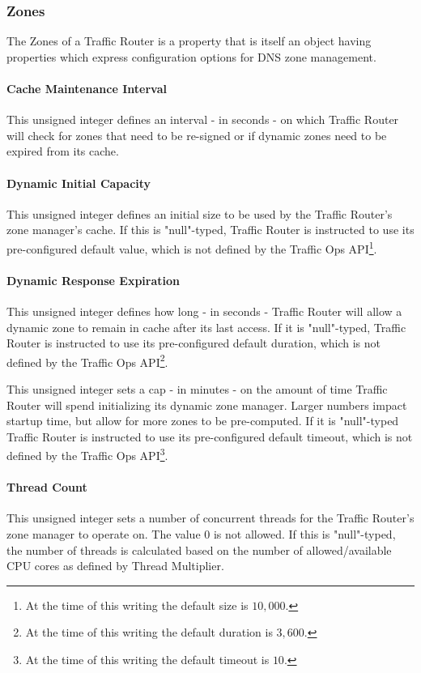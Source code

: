 \subsubsection{Zones}
The Zones of a Traffic Router is a property that is itself an object having
properties which express configuration options for DNS zone management.

\paragraph{Cache Maintenance Interval}
This unsigned integer defines an interval - in seconds - on which Traffic Router
will check for zones that need to be re-signed or if dynamic zones need to be
expired from its cache.

\paragraph{Dynamic Initial Capacity}
This unsigned integer defines an initial size to be used by the Traffic Router's
zone manager's cache. If this is "null"-typed, Traffic Router is instructed to
use its pre-configured default value, which is not defined by the Traffic Ops
API\footnote{At the time of this writing the default size is $10,000$.}.

\paragraph{Dynamic Response Expiration}
This unsigned integer defines how long - in seconds - Traffic Router will allow
a dynamic zone to remain in cache after its last access. If it is "null"-typed,
Traffic Router is instructed to use its pre-configured default duration, which
is not defined by the Traffic Ops API\footnote{At the time of this writing the
default duration is $3,600$.}.

This unsigned integer sets a cap - in minutes - on the amount of time Traffic
Router will spend initializing its dynamic zone manager. Larger numbers impact
startup time, but allow for more zones to be pre-computed. If it is "null"-typed
Traffic Router is instructed to use its pre-configured default timeout, which is
not defined by the Traffic Ops API\footnote{At the time of this writing the
default timeout is $10$.}.

\paragraph{Thread Count}
This unsigned integer sets a number of concurrent threads for the Traffic
Router's zone manager to operate on. The value 0 is not allowed. If this is
"null"-typed, the number of threads is calculated based on the number of
allowed/available CPU cores as defined by Thread Multiplier.

